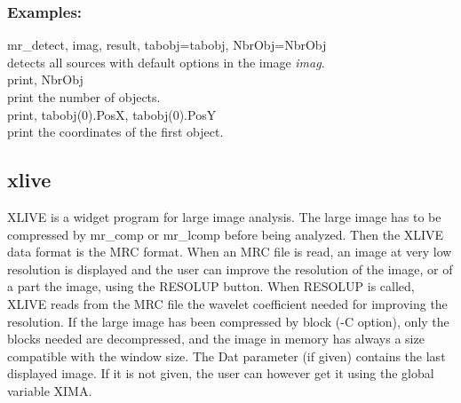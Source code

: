 \subsubsection*{Examples:} 
mr\_detect, imag, result, tabobj=tabobj, NbrObj=NbrObj \\
detects all sources with default options in the image {\em imag}. \\
print, NbrObj \\
print the number of objects. \\
print, tabobj(0).PosX, tabobj(0).PosY \\
print the coordinates of the first object. \\

\subsection{xlive}
XLIVE is a widget program for large image analysis. The large image
has to be compressed  by mr\_comp or mr\_lcomp before being 
analyzed. Then the XLIVE data format is the MRC format.
When an MRC file is read, an image at very low resolution is displayed
and the user can improve the resolution of the image, or of a part
the image, using the RESOLUP button. When RESOLUP is called,
XLIVE reads from the MRC file the  wavelet coefficient needed for improving
the resolution. 
If the large image has been compressed by block (-C option), only  
the blocks needed are decompressed, and the image in memory has always
a size compatible with the window size.
The Dat parameter (if given) contains the last displayed image.
If it is not given, the user can however get it using the global
variable XIMA.

